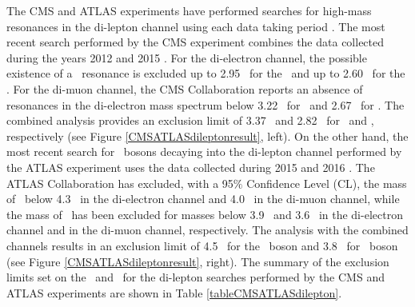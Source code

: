 \begin{itemize}
\noindent The CMS and ATLAS experiments have performed searches for high-mass resonances in
the di-lepton channel using each data taking period \cite{CMSZprimetodileptonrun1run2, CMSZprimetodileptonrun1, CMSZprimetodileptonrun1sqrt7,
ATLASZprimetodileptonrun2, ATLASZprimetodilepton2015, ATLASZprimetodilepton2012, ATLASZprimetodileptonrun1}. The most recent
search performed by the CMS experiment combines the data collected during the years 2012 and 
2015 \cite{CMSZprimetodileptonrun1run2}. For the di-electron channel, the possible 
existence of a \Zprime~resonance is excluded up to 2.95 \TeV~for the \ZprimeSSM~and up to 
2.60 \TeV~for the \Zprimepsi. For the di-muon channel, the CMS Collaboration
 reports an absence of resonances in the di-electron mass spectrum below 3.22
\TeV~for \ZprimeSSM~and 2.67 \TeV~for \Zprimepsi. The combined analysis
provides an exclusion limit of 3.37 \TeV~and 2.82 \TeV~for \ZprimeSSM~and 
\Zprimepsi, respectively (see Figure \ref{CMSATLASdileptonresult}, left). On the other hand, 
the most recent search for \Zprime~bosons decaying into the di-lepton channel performed 
by the ATLAS experiment uses the data collected during 2015 and 2016 \cite{ATLASZprimetodileptonrun2}. The ATLAS 
Collaboration has excluded, with a 95$\%$ Confidence Level (CL), the mass of \ZprimeSSM~below 4.3 \TeV~in the
di-electron channel and 4.0 \TeV~in the di-muon channel, while the mass of \Zprimepsi~has been excluded for masses
below 3.9 \TeV~and 3.6 \TeV~in the di-electron channel and in the di-muon channel, respectively. The analysis with the 
combined channels results in an exclusion limit of 4.5 \TeV~for the \ZprimeSSM~boson and 3.8 \TeV~for 
\Zprimepsi~boson (see Figure \ref{CMSATLASdileptonresult}, right). The summary of the exclusion 
limits set on the \ZprimeSSM~and \Zprimepsi~for the di-lepton searches performed
by the CMS and ATLAS experiments are shown in Table \ref{tableCMSATLASdilepton}.\\


\begin{table}[ht]
\begin{center}
\begin{tabular}{|c|c|c|c|c|}   \hline   \hline
        

\end{tabular}
\end{center}
\end{table}
\end{itemize}
